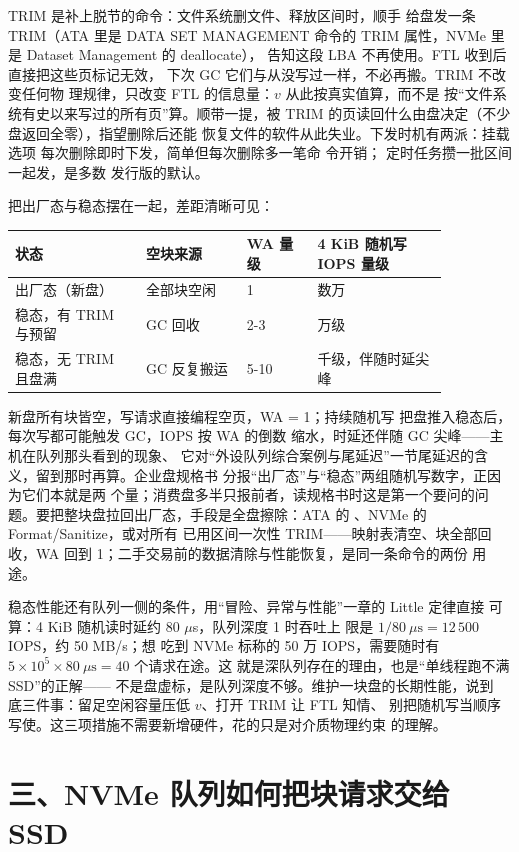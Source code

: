 TRIM 是补上脱节的命令：文件系统删文件、释放区间时，顺手
给盘发一条 TRIM（ATA 里是 DATA SET MANAGEMENT 命令的
TRIM 属性，NVMe 里是 Dataset Management 的 deallocate），
告知这段 LBA 不再使用。FTL 收到后直接把这些页标记无效，
下次 GC 它们与从没写过一样，不必再搬。TRIM 不改变任何物
理规律，只改变 FTL 的信息量：$v$ 从此按真实值算，而不是
按“文件系统有史以来写过的所有页”算。顺带一提，被 TRIM
的页读回什么由盘决定（不少盘返回全零），指望删除后还能
恢复文件的软件从此失业。下发时机有两派：挂载选项
 每次删除即时下发，简单但每次删除多一笔命
令开销； 定时任务攒一批区间一起发，是多数
发行版的默认。

把出厂态与稳态摆在一起，差距清晰可见：

\begin{longtable}{L{0.26\linewidth}L{0.2\linewidth}L{0.14\linewidth}L{0.26\linewidth}}
\toprule
状态 & 空块来源 & WA 量级 & 4 KiB 随机写 IOPS 量级 \\
\midrule
出厂态（新盘） & 全部块空闲 & 1 & 数万 \\\tablerowrule
稳态，有 TRIM 与预留 & GC 回收 & 2-3 & 万级 \\\tablerowrule
稳态，无 TRIM 且盘满 & GC 反复搬运 & 5-10 & 千级，伴随时延尖峰 \\
\bottomrule
\end{longtable}

新盘所有块皆空，写请求直接编程空页，WA = 1；持续随机写
把盘推入稳态后，每次写都可能触发 GC，IOPS 按 WA 的倒数
缩水，时延还伴随 GC 尖峰——主机在队列那头看到的现象、
它对“外设队列综合案例与尾延迟”一节尾延迟的含义，留到那时再算。企业盘规格书
分报“出厂态”与“稳态”两组随机写数字，正因为它们本就是两
个量；消费盘多半只报前者，读规格书时这是第一个要问的问
题。要把整块盘拉回出厂态，手段是全盘擦除：ATA 的
、NVMe 的 Format/Sanitize，或对所有
已用区间一次性 TRIM——映射表清空、块全部回收，WA 回到
1；二手交易前的数据清除与性能恢复，是同一条命令的两份
用途。

稳态性能还有队列一侧的条件，用“冒险、异常与性能”一章的 Little 定律直接
可算：4 KiB 随机读时延约 80 $\mu$s，队列深度 1 时吞吐上
限是 $1/80\ \mu\mathrm{s}=12\,500$ IOPS，约 50 MB/s；想
吃到 NVMe 标称的 50 万 IOPS，需要随时有
$5\times10^{5}\times80\ \mu\mathrm{s}=40$ 个请求在途。这
就是深队列存在的理由，也是“单线程跑不满 SSD”的正解——
不是盘虚标，是队列深度不够。维护一块盘的长期性能，说到
底三件事：留足空闲容量压低 $v$、打开 TRIM 让 FTL 知情、
别把随机写当顺序写使。这三项措施不需要新增硬件，花的只是对介质物理约束
的理解。

\section{三、NVMe 队列如何把块请求交给 SSD}

